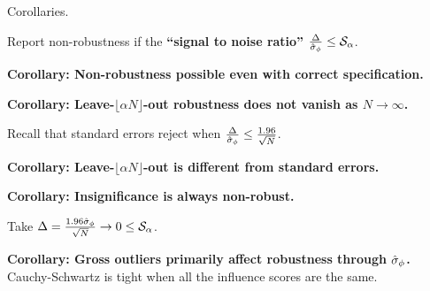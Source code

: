 
\begin{frame}{Corollaries.}


\pause
Report non-robustness if the \textbf{``signal to noise ratio''}
$\frac{\Delta}{\hat\sigma_{\phi}} \le \mathcal{S}_\alpha$.

\hrulefill


\pause
\vspace{0.5em}
\textbf{Corollary:  Non-robustness possible even with correct specification.}
\vspace{-0.4em}

\pause
\vspace{0.5em}
\textbf{Corollary:  Leave-$\lfloor \alpha N \rfloor$-out robustness does not vanish as $N \rightarrow \infty$.}
%

\pause
\vspace{0.5em}
Recall that standard errors reject when
$\frac{\Delta}{\hat\sigma_{\phi}} \le \frac{1.96}{\sqrt{N}}$.

\pause
\vspace{0.5em}
\textbf{Corollary:  Leave-$\lfloor \alpha N \rfloor$-out is different from standard errors.}

\pause
\vspace{0.5em}
\textbf{Corollary:  Insignificance is always non-robust.}
\vspace{-0.4em}

Take $\Delta = \frac{1.96 \hat \sigma_\phi}{\sqrt{N}} \rightarrow 0 \le
\mathcal{S}_\alpha$.

\pause
\vspace{0.5em}
\textbf{Corollary:  Gross outliers primarily affect robustness
through $\hat\sigma_{\phi}$.}
\vspace{-0.4em}
Cauchy-Schwartz is tight when all the influence scores are the same.

\end{frame}
